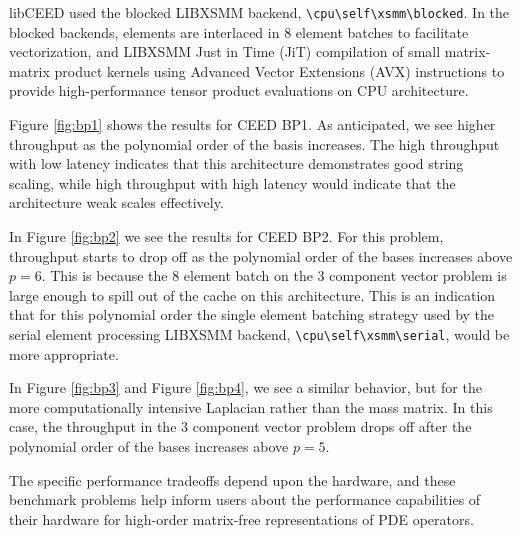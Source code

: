 libCEED used the blocked LIBXSMM \cite{libxsmm} backend, \lstinline{\cpu\self\xsmm\blocked}.
In the blocked backends, elements are interlaced in 8 element batches to facilitate vectorization, and LIBXSMM Just in Time (JiT) compilation of small matrix-matrix product kernels using Advanced Vector Extensions (AVX) instructions to provide high-performance tensor product evaluations on CPU architecture.

Figure \ref{fig:bp1} shows the results for CEED BP1.
As anticipated, we see higher throughput as the polynomial order of the basis increases.
The high throughput with low latency indicates that this architecture demonstrates good string scaling, while high throughput with high latency would indicate that the architecture weak scales effectively.

In Figure \ref{fig:bp2} we see the results for CEED BP2.
For this problem, throughput starts to drop off as the polynomial order of the bases increases above $p = 6$.
This is because the 8 element batch on the 3 component vector problem is large enough to spill out of the cache on this architecture.
This is an indication that for this polynomial order the single element batching strategy used by the serial element processing LIBXSMM backend, \lstinline{\cpu\self\xsmm\serial}, would be more appropriate.

In Figure \ref{fig:bp3} and Figure \ref{fig:bp4}, we see a similar behavior, but for the more computationally intensive Laplacian rather than the mass matrix.
In this case, the throughput in the 3 component vector problem drops off after the polynomial order of the bases increases above $p = 5$.

The specific performance tradeoffs depend upon the hardware, and these benchmark problems help inform users about the performance capabilities of their hardware for high-order matrix-free representations of PDE operators.
